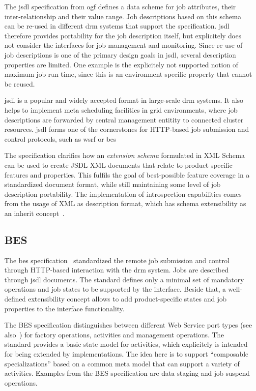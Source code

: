 \documentclass[twocolumn]{svjour3}       %
\begin{document}
The \gls{jsdl} specification from \gls{ogf} defines a data scheme for job attributes, their inter-relationship and their value range. Job descriptions based on this schema can be re-used in different \gls{drm} systems that support the specification. \gls{jsdl} therefore provides portability for the job description itself, but explicitely does not consider the interfaces for job management and monitoring. Since re-use of job descriptions is one of the primary design goals in \gls{jsdl}, several description properties are limited. One example is the explicitely not supported notion of maximum job run-time, since this is an environment-specific property that cannot be reused.

\gls{jsdl} is a popular and widely accepted format in large-scale \gls{drm} systems. It also helps to implement meta scheduling facilities in grid environments, where job descriptions are forwarded by central management entitity to connected cluster resources. \gls{jsdl} forms one of the cornerstones for HTTP-based job submission and control protocols, such as \gls{wsrf} or \gls{bes}

The specification clarifies how an \emph{extension schema} formulated in XML Schema can be used to create JSDL XML documents that relate to product-specific features and properties. This fulfils the goal of best-possible feature coverage in a standardized document format, while still maintaining some level of job description portability. The implementation of introspection capabilities comes from the usage of XML as description format, which has schema extensibility as an inherit concept~\cite{xmlschema}. 

\subsection{BES}

The \gls{bes} specification~\cite{gfd.108} standardized the remote job submission and control through HTTP-based interaction with the \gls{drm} system. Jobs are described through \gls{jsdl} documents. The standard defines only a minimal set of mandatory operations and job states to be supported by the interface. Beside that, a well-defined extensibility concept allows to add product-specific states and job properties to the interface functionality. 

The BES specification distinguishes between different Web Service port types (see also~\cite{citemaster_579}) for factory operations, activities and management operations. The standard provides a basic state model for activities, which explicitely is intended for being extended by implementations. The idea here is to support ``composable specializations'' based on a common meta model that can support a variety of activities. Examples from the BES specification are data staging and job suspend operations.
\end{document}
